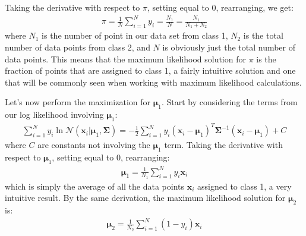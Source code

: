 Taking the derivative with respect to $\pi$, setting equal to 0, rearranging, we get:
\begin{align*}
	\pi = \frac{1}{N} \sum_{i=1}^{N} y_{i} = \frac{N_{1}}{N} = \frac{N_{1}}{N_{1} + N_{2}}
\end{align*}
where $N_{1}$ is the number of point in our data set from class 1, $N_{2}$ is the total number of data points from class 2, and $N$ is obviously just the total number of data points. This means that the maximum likelihood solution for $\pi$ is the fraction of points that are assigned to class 1, a fairly intuitive solution and one that will be commonly seen when working with maximum likelihood calculations.

Let's now perform the maximization for $\boldsymbol{\mu}_{1}$. Start by considering the terms from our log likelihood involving $\boldsymbol{\mu}_{1}$:
\begin{align*}
	\sum_{i=1}^{N} y_{i} \ln \mathcal{N}(\textbf{x}_{i} | \boldsymbol{\mu}_{1}, \boldsymbol{\Sigma}) = -\frac{1}{2} \sum_{i=1}^{N} y_{i} (\textbf{x}_{i} - \boldsymbol{\mu}_{1})^{T}\boldsymbol{\Sigma}^{-1}(\textbf{x}_{i} - \boldsymbol{\mu}_{1}) + C
\end{align*}
where $C$ are constants not involving the $\boldsymbol{\mu}_{1}$ term. Taking the derivative with respect to $\boldsymbol{\mu}_{1}$, setting equal to 0, rearranging:
\begin{align*}
	\boldsymbol{\mu}_{1} = \frac{1}{N_{1}} \sum_{i=1}^{N} y_{i}\textbf{x}_{i}
\end{align*}
which is simply the average of all the data points $\textbf{x}_{i}$ assigned to class 1, a very intuitive result. By the same derivation, the maximum likelihood solution for $\boldsymbol{\mu}_{2}$ is:
\begin{align*}
	\boldsymbol{\mu}_{2} = \frac{1}{N_{2}} \sum_{i=1}^{N} (1-y_{i})\textbf{x}_{i}
\end{align*}

